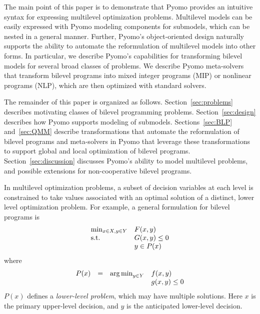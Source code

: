 The main point of this paper is to demonstrate that Pyomo provides
an intuitive syntax for expressing multilevel optimization problems.
Multilevel models can be easily expressed with Pyomo modeling
components for submodels, which can be nested in a general manner.
Further, Pyomo's object-oriented design naturally supports the
ability to automate the reformulation of multilevel models into
other forms.  In particular, we describe Pyomo's capabilities for
transforming bilevel models for several broad classes of problems.
We describe Pyomo meta-solvers that transform bilevel programs into
mixed integer programs (MIP) or nonlinear programs (NLP), which are
then optimized with standard solvers.

The remainder of this paper is organized as follows.
Section~\ref{sec:problems} describes motivating classes of bilevel
programming problems.  Section~\ref{sec:design} describes how Pyomo
supports modeling of submodels.  Sections~\ref{sec:BLP} and~\ref{sec:QMM}
describe transformations that automate the reformulation of bilevel
programs and meta-solvers in Pyomo that leverage these transformations
to support global and local optimization of bilevel programs.
Section~\ref{sec:discussion} discusses Pyomo's ability to model multilevel problems, and possible extensions for non-cooperative bilevel programs.

\fi


\label{sec:modeling}

In multilevel optimization problems, a subset of decision variables
at each level is constrained to take values associated with an
optimal solution of a distinct, lower level optimization problem.
For example, a general formulation for bilevel programs is
\begin{equation}
\label{eqn:bilevel}
\begin{array}{ll}
\min_{x \in X, y \in Y}   & F(x,y)\\
\textrm{s.t.}                 & G(x,y) \leq 0\\
                    & y \in P(x)
\end{array}
\end{equation}
where
\[
\begin{array}{llll}
P(x) & = & \operatorname*{arg\,min}_{y \in Y}    & f(x,y)\\
 & &                            & g(x,y) \leq 0
\end{array}
\]
$P(x)$ defines a \textit{lower-level problem}, which may have multiple solutions.
Here $x$ is the primary upper-level decision, and $y$ is the anticipated lower-level 
decision.

